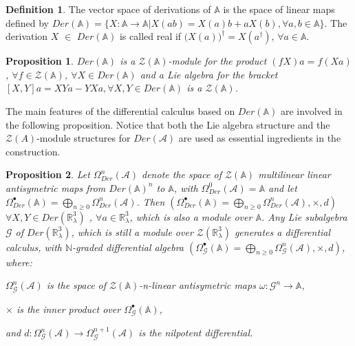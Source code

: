 \documentclass[a4paper,11pt]{article} %
\numberwithin{equation}{section} %
\numberwithin{figure}{section} %
\theoremstyle{plain} %
\newtheorem{prop}{Proposition}[section]
\theoremstyle{definition} %
\newtheorem{dfn}{Definition}[section]
\theoremstyle{remark} %
\begin{document}
\begin{dfn}
The vector space of derivations of $\mathbb{A}$ is the space of linear maps defined by $ Der(\mathbb{A}) = \{ X : \mathbb{A} \rightarrow \mathbb{A} | X(ab) = X(a)b + aX(b), \forall a, b \in \mathbb{A} \}.$
The derivation $X$ $\in$ $Der(\mathbb{A})$ is called real if $\Big( X(a) \Big)^{\dagger} = X(a^{\dagger})$, $\forall a \in \mathbb{A}$.
\end{dfn}

\begin{prop}
 $ Der(\mathbb{A}) $ is a $\mathcal{Z}(\mathbb{A})$-module for the product $(fX)a = f(Xa)$, $\forall f \in \mathcal{Z}(\mathbb{A})$, $\forall X \in Der(\mathbb{A})$ and a Lie algebra for the bracket $[X,Y]a = XYa - YXa, \forall X, Y \in Der(\mathbb{A}) $ is a $\mathcal{Z}(\mathbb{A})$.
\end{prop}

\noindent
The main features of the differential calculus based on $Der(\mathbb{A})$ are involved in the following proposition. Notice that both the Lie algebra structure and the $\mathcal{Z}(A)$-module structures for $Der(\mathcal{A})$ are used as essential ingredients in the construction.
\begin{prop}
 Let $\Omega^{n}_{Der}(\mathcal{A})$ denote the space of $\mathcal{Z}(\mathbb{A})$ multilinear linear antisymetric maps from $Der(\mathbb{A})^{n}$ to $\mathbb{A}$, with $\Omega^{0}_{Der}(\mathcal{A})=\mathbb{A}$ and let $\Omega^{\bullet}_{Der}(\mathbb{A}) = \bigoplus_{n \geq 0} \Omega^{n}_{Der}(\mathcal{A})$. Then $\left( \Omega^{\bullet}_{Der}(\mathbb{A}) = \bigoplus_{n \geq 0} \Omega^{n}_{Der}(\mathcal{A}),\times, d \right)$
 $\forall X, Y \in Der(\mathbb{R}^{3}_{\lambda})$ , $\forall a \in \mathbb{R}^{3}_{\lambda}$, which is also a module over $\mathcal{\mathbb{A}}$. Any Lie subalgebra $\mathcal{G}$ of $Der(\mathbb{R}^{3}_{\lambda})$, which is still a module over $\mathcal{Z}(\mathbb{R}^{3}_{\lambda})$ generates a differential calculus, with $\mathbb{N}$-graded differential algebra $\left( \Omega^{\bullet}_{\mathcal{G}}(\mathbb{A}) = \bigoplus_{n \geq 0} \Omega^{n}_{\mathcal{G}}(\mathcal{A}),\times, d \right)$, where:
\begin{description}
 \item $\Omega^{n}_{\mathcal{G}}(\mathcal{A})$ is the space of $\mathcal{Z}(\mathbb{A})$-n-linear antisymetric maps $\omega : \mathcal{G}^{n} \rightarrow \mathbb{A}$,
 \item $\times$ is the inner product over $\Omega^{\bullet}_{\mathcal{G}}(\mathbb{A})$,
 \item and $d : \Omega^{n}_{\mathcal{G}}(\mathcal{A}) \rightarrow \Omega^{n+1}_{\mathcal{G}}(\mathcal{A})$ is the nilpotent differential. 
\end{description}
\end{prop}
\end{document}
